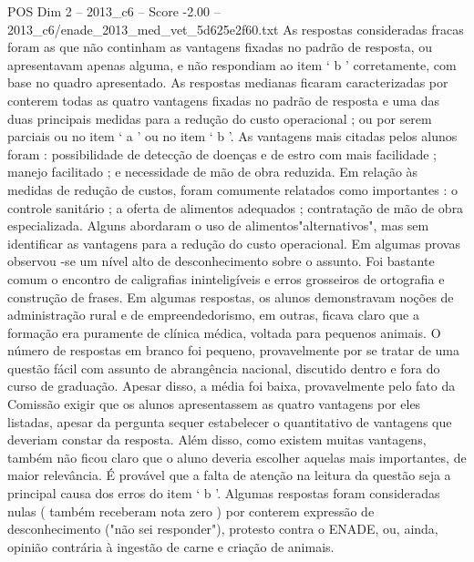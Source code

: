 \begin{textsample}{POS Dim 2 – 2013\_c6 – Score -2.00 – 2013\_c6/enade\_2013\_med\_vet\_5d625e2f60.txt}
As respostas consideradas fracas foram as que não continham as vantagens fixadas no padrão de resposta, ou apresentavam apenas alguma, e não respondiam ao item ‘ b ’ corretamente, com base no quadro apresentado.
As respostas medianas ficaram caracterizadas por conterem todas as quatro vantagens fixadas no padrão de resposta e uma das duas principais medidas para a redução do custo operacional ; ou por serem parciais ou no item ‘ a ’ ou no item ‘ b ’.
As vantagens mais citadas pelos alunos foram : possibilidade de detecção de doenças e de estro com mais facilidade ; manejo facilitado ; e necessidade de mão de obra reduzida.
Em relação às medidas de redução de custos, foram comumente relatados como importantes : o controle sanitário ; a oferta de alimentos adequados ; contratação de mão de obra especializada.
Alguns abordaram o uso de alimentos"alternativos", mas sem identificar as vantagens para a redução do custo operacional.
Em algumas provas observou -se um nível alto de desconhecimento sobre o assunto.
Foi bastante comum o encontro de caligrafias ininteligíveis e erros grosseiros de ortografia e construção de frases.
Em algumas respostas, os alunos demonstravam noções de administração rural e de empreendedorismo, em outras, ficava claro que a formação era puramente de clínica médica, voltada para pequenos animais.
O número de respostas em branco foi pequeno, provavelmente por se tratar de uma questão fácil com assunto de abrangência nacional, discutido dentro e fora do curso de graduação.
Apesar disso, a média foi baixa, provavelmente pelo fato da Comissão exigir que os alunos apresentassem as quatro vantagens por eles listadas, apesar da pergunta sequer estabelecer o quantitativo de vantagens que deveriam constar da resposta.
Além disso, como existem muitas vantagens, também não ficou claro que o aluno deveria escolher aquelas mais importantes, de maior relevância.
É provável que a falta de atenção na leitura da questão seja a principal causa dos erros do item ‘ b ’.
Algumas respostas foram consideradas nulas ( também receberam nota zero ) por conterem expressão de desconhecimento ("não sei responder"), protesto contra o ENADE, ou, ainda, opinião contrária à ingestão de carne e criação de animais.

\end{textsample}
